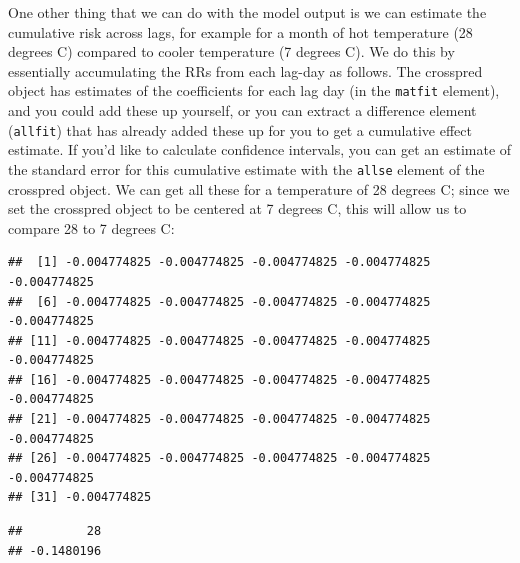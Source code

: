 \documentclass[
]{book}
\newenvironment{Shaded}{\begin{snugshade}}{\end{snugshade}}
\newcommand{\CommentTok}[1]{\textcolor[rgb]{0.56,0.35,0.01}{\textit{#1}}}
\newcommand{\DecValTok}[1]{\textcolor[rgb]{0.00,0.00,0.81}{#1}}
\newcommand{\NormalTok}[1]{#1}
\newcommand{\OperatorTok}[1]{\textcolor[rgb]{0.81,0.36,0.00}{\textbf{#1}}}
\begin{document}
One other thing that we can do with the model output is we can estimate the cumulative risk
across lags, for example for a month of hot temperature (28 degrees C) compared to cooler temperature (7 degrees C). We do this by essentially accumulating the RRs from each lag-day as follows. The crosspred object has estimates of the coefficients for each lag day (in the
\texttt{matfit} element), and you
could add these up yourself, or you can extract a difference element (\texttt{allfit}) that has
already added these up for you to get a cumulative effect estimate. If you'd like to
calculate confidence intervals, you can get an estimate of the standard error for this
cumulative estimate with the \texttt{allse} element of the crosspred object. We can get all these
for a temperature of 28 degrees C; since we set the crosspred object to be centered at
7 degrees C, this will allow us to compare 28 to 7 degrees C:

\begin{Shaded}
\end{Shaded}

\begin{verbatim}
##  [1] -0.004774825 -0.004774825 -0.004774825 -0.004774825 -0.004774825
##  [6] -0.004774825 -0.004774825 -0.004774825 -0.004774825 -0.004774825
## [11] -0.004774825 -0.004774825 -0.004774825 -0.004774825 -0.004774825
## [16] -0.004774825 -0.004774825 -0.004774825 -0.004774825 -0.004774825
## [21] -0.004774825 -0.004774825 -0.004774825 -0.004774825 -0.004774825
## [26] -0.004774825 -0.004774825 -0.004774825 -0.004774825 -0.004774825
## [31] -0.004774825
\end{verbatim}

\begin{Shaded}
\end{Shaded}

\begin{verbatim}
##         28 
## -0.1480196
\end{verbatim}
\end{document}
